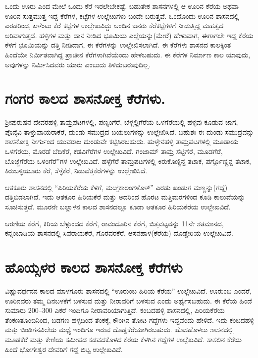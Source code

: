 ಒಂದು ಊರು ಎಂದ ಮೇಲೆ ಒಂದು ಕೆರೆ ಇರಲೇಬೇಕಷ್ಟೆ. ಬಹುತೇಕ ಶಾಸನಗಳಲ್ಲಿ ಆ ಊರಿನ ಕೆರೆಯ ಅಥವಾ ಊರಿನ ಸುತ್ತಮುತ್ತ ಇದ್ದ ಕೆರೆಗಳ, ಕಟ್ಟೆಗಳ ಉಲ್ಲೇಖಗಳು ಬಂದೇ ಬರುತ್ತವೆ. ಒಂದೊಂದು ಊರಿನ ಶಾಸನದಲ್ಲಿ ಎರಡರಿಂದ, ಏಳೆಂಟು ಕೆರೆ ಕಟ್ಟೆಗಳ ಉಲ್ಲೇಖವಿದ್ದು ಅಂದಿನ ಜನರು ಕೆರೆಕಟ್ಟೆಗಳಿಗೆ ನೀಡುತ್ತಿದ್ದ ಮಹತ್ವದ ಅರಿವಾಗುತ್ತದೆ. ಹಳ್ಳಿಗಳ ಮತ್ತು ದಾನ ನೀಡಿದ ಭೂಮಿಯ ಎಲ್ಲೆಯನ್ನು(ಮೇರೆ) ಹೇಳುವಾಗ, ಈಗಾಗಲೇ ಇದ್ದ ಕೆರೆಯ ಕೆಳಗೆ ಭೂಮಿಯನ್ನು ದತ್ತಿ ನೀಡಿದಾಗ, ಈ ಕೆರೆಗಳನ್ನು ಉಲ್ಲೇಖಿಸಲಾಗಿದೆ. ಈ ಕೆರೆಗಳು ಶಾಸನದ ಕಾಲಕ್ಕಿಂತ ಹಿಂದೆಯೇ ನಿರ್ಮಿತವಾಗಿದ್ದ ಪ್ರಾಚೀನ ಕೆರೆಗಳಾಗಿವೆಯೆಂದು ಹೇಳಬಹುದು. ಈ ಕೆರೆಗಳ ನಿರ್ಮಾಣ ಕಾಲ ಯಾವುದು, ಅವುಗಳನ್ನು ನಿರ್ಮಿಸಿದವರು ಯಾರು ಎಂಬುದು ತಿಳಿದುಬರುವುದಿಲ್ಲ.


\section{ಗಂಗರ ಕಾಲದ ಶಾಸನೋಕ್ತ ಕೆರೆಗಳು.}

ಶ‍್ರೀಪುರುಷನ ದೇವರಹಳ್ಳಿ ತಾಮ್ರಪಟಗಳಲ್ಲಿ, ಪಣ್ಯಂಗೆರೆ, ಬೆಳ್ಗಲ್ಲಿಗೆರೆಯ ಒಳಗೆರೆಯಲ್ಲಿ ಹಳ್ಳವು ಕೂಡುವ ಜಾಗ, ಪೊನ್ಕೆವಿ ತಾಳ್ತುವಾಯರಾಕೆರೆ, ದುಂಡು ಸಮುದ್ರದ ಬಯಲುಗಳನ್ನು ಉಲ್ಲೇಖಿಸಿದೆ. ಬಹುಶಃ ಈ ದುಂಡು ಸಮುದ್ರವನ್ನು ಶಾಸನೋಕ್ತ ನೀರ್ಗುಂದ ಯುವರಾಜ ದುಂಡುವೇ ಕಟ್ಟಿಸಿರಬಹುದು. ಹುಳ್ಳೇನಹಳ್ಳಿ ತಾಮ್ರಪಟಗಳಲ್ಲಿ ಮೂಡಾಯ ಒಳಗೆರೆಯ, ಮೊರಡೆ ಬೆದಿಕೆರೆ, ಕಡವಿಗೆರೆಗಳ ಉಲ್ಲೇಖವಿದೆ. ಗಂಜಾಮ್ ತಾಮ್ರ ಸೆಟ್ಟಿಗೆರೆ, ಮೂಡಗೆರೆ, ಬೊಜ್ಜೆಗೆರೆಯ ಒಳಂಗೆರೆ”ಗಳ ಉಲ್ಲೇಖವಿದೆ. ಹಳ್ಳೆಗೆರೆ ತಾಮ್ರಪಟಗಳಲ್ಲಿ ಕಿರುಕೊಣ್ಣಿನ್ದ ತಟಾಕ, ಪರ್ಗ್ಗೊಣ್ಣಿನ್ದ ತಟಾಕ, ಕಿರುಬಳ್ಳಿಯೂರು ಕೆರೆ, ಸೆಳ್ಳೆಕೆರೆ, ನಿಡುವೆತ್ತಕೆರೆಗಳನ್ನು ಉಲ್ಲೇಖಿಸಿದೆ.

ಆತಕೂರು ಶಾಸನದಲ್ಲಿ “ಪಿರಿಯಕೆರೆಯ ಕೆಳಗೆ, ಮೞ್ತಿಕಾಲಂಗಳೊಳ್​” ಎರಡು ಖಂಡುಗ ಮಣ್ಣನ್ನು(ಗದ್ದೆ) ದತ್ತಿಬಿಡಲಾಗಿದೆ. ಇದು ಆತಕೂರ ಹಿರಿಯಕೆರೆ ಮತ್ತು ಅದರಿಂದ ಹೊರಟ ಮತ್ತಿಮರಗಳಿಂದ ಕೂಡಿ ಕಾಲುವೆಯನ್ನು ಸೂಚಿಸುತ್ತದೆ. ಮೂರನೇ ಬಲ್ಲಾಳನ ಕಾಲದ ಶಾಸನದಲ್ಲೂ ಕೂಡಾ ಆತಕೂರ ಹಿರಿಯಕೆರೆಯ ಉಲ್ಲೇಖವಿದೆ.

ಆರಣಿಯ ಕೆರೆಗೆ, ಕಿರಿಯ ಬೆಳ್ಗುಂದದ ಕೆರೆಗೆ, ರಾವಂದೂರಿನ ಕೆರೆಗೆ, ಬಿತ್ತವಟ್ಟವನ್ನು 11ನೇ ಶತಮಾನದ, ಕನ್ನಂಬಾಡಿಯ ಶಾಸನದಲ್ಲಿ ಸಿವರಾಯಕೆರೆ, ಗೊರವರಕೆರೆ, ಆಸನಹಾಳ(ಕೆರೆಯ) ದೊಡ್ಡೇರಿಯ ಉಲ್ಲೇಖವಿದೆ.


\section{ಹೊಯ್ಸಳರ ಕಾಲದ ಶಾಸನೋಕ್ತ ಕೆರೆಗಳು}

ವಿಷ್ಣುವರ್ಧನನ ಕಾಲದ ಮಾಳಗೂರು ಶಾಸನದಲ್ಲಿ “ಊರುಂಬ ಹಿರಿಯ ಕೆರೆಯ” ಉಲ್ಲೇಖವಿದೆ. ಊರುಂಬ ಎಂದರೆ, ಊರಿನವರು ತಮ್ಮ ದಿನಬಳಕೆಗೆ ಬಳಸುವ ಮತ್ತು ನೀರಾವರಿಗೆ ಬಳಸುವ ಎಂದು ಅರ್ಥೈಸಬಹುದು. ಈ ಕೆರೆಯ ಹಿಂದೆ ಸುಮಾರು 200–300 ಎಕರೆ ಇಂದಿಗೂ ನೀರಾವರಿಯಾಗುತ್ತಿದೆ. ಕಂಬದಹಳ್ಳಿ ಶಾಸನದಲ್ಲಿ, ಪಿರಿಯಕೆರೆಯ ತೆಂಕಣತೂಂಬಿನಿಂದ, ಬಡಗಣ ಹಳ್ಳದಿಂದ ತೆಂಕಕ್ಕೆ, ಕೌಂಗಿನ ತೋಟ ಗದ್ದೆಗಳು ಇದ್ದವೆಂದು ಹೇಳಿದೆ. ಇದು ಕಂಬದಹಳ್ಳಿ ಮತ್ತು ಬಿಂಡಿಗನವಿಲೆಯ ಮಧ್ಯೆ ಇಂದಿಗೂ ಇರುವ ದೊಡ್ಡಕೆರೆಯಾಗಿರಬಹುದು. ಹೊಸಹೊಳಲು ಶಾಸನದಲ್ಲಿ ಮೂಡಕೆರೆ ಮತ್ತು ಕೇಣಿಯ ಸಮೀಪದ ಕಡವದಕೊಳದ ಕೆರೆಯ ಕೆಳಗಿನ ಗದ್ದೆಗಳ ಉಲ್ಲೆಖವಿದೆ. ಸಾಸಲಿನ ಕೆರೆಯ ಹಿಂದೆ ಭೋಗೇಶ್ವರ ದೇವರಿಗೆ ಗದ್ದೆ ಬಿಟ್ಟ ಉಲ್ಲೇಖವಿದೆ.

